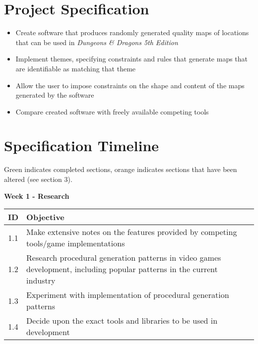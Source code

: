 \documentclass{article}
\begin{document}
\appendix
\section{Project Specification}

\begin{itemize}
    \item Create software that produces randomly generated quality maps of locations that can be used in \textit{Dungeons \& Dragons 5th Edition}
    \item Implement themes, specifying constraints and rules that generate maps that are identifiable as matching that theme
    \item Allow the user to impose constraints on the shape and content of the maps generated by the software
    \item Compare created software with freely available competing tools
\end{itemize}

\section{Specification Timeline}

Green indicates completed sections, orange indicates sections that have been altered (see section 3).

\large
\textbf{Week 1 - Research}
\begin{table}[h!]
    \begin{tabularx}{\textwidth}{|Sl|X|}
        \hline
            ID  & Objective \\
        \hline
            1.1
        &
            Make extensive notes on the features provided by competing tools/game implementations
        \\ \hline
            1.2
        &
            Research procedural generation patterns in video games development, including popular patterns in the current industry
        \\\hline
            1.3
        &
            Experiment with implementation of procedural generation patterns
        \\\hline
            1.4
        &
            Decide upon the exact tools and libraries to be used in development  
        \\\hline
    \end{tabularx}
\end{table}
\end{document}
